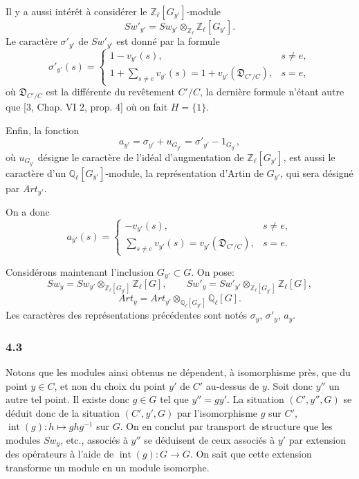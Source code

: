 \documentclass[11pt]{article}
\begin{document}
Il y a aussi intérêt à considérer le $\mathbb Z_\ell[G_{y'}]$-module
\[
Sw'_{y'}=Sw_{y'}\otimes_{\mathbb Z_\ell}\mathbb Z_\ell[G_{y'}].
\tag{4.2.3}
\]
Le caractère $\sigma'_{y'}$ de $Sw'_{y'}$ est donné par la formule
\[
\sigma'_{y'}(s)=
\begin{cases}
1-v_{y'}(s),& s\ne e,\\[0.4em]
\displaystyle 1+\sum_{s\ne e}v_{y'}(s)
=1+v_{y'}(\mathfrak D_{C'/C}),& s=e,
\end{cases}
\tag{4.2.4}
\]
où $\mathfrak D_{C'/C}$ est la différente du revêtement $C'/C$, la dernière formule n'étant autre que [3, Chap. VI 2, prop. 4] où on fait $H=\{1\}$.

Enfin, la fonction
\[
a_{y'}=\sigma_{y'}+u_{G_{y'}}=\sigma'_{y'}-1_{G_{y'}},
\tag{4.2.5}
\]
où $u_{G_{y'}}$ désigne le caractère de l'idéal d'augmentation de $\mathbb Z_\ell[G_{y'}]$, est aussi le caractère d'un $\mathbb Q_\ell[G_{y'}]$-module, la représentation d'Artin de $G_{y'}$, qui sera désigné par $Art_{y'}$.

On a donc
\[
a_{y'}(s)=
\begin{cases}
-v_{y'}(s),& s\ne e,\\[0.4em]
\displaystyle\sum_{s\ne e}v_{y'}(s)=v_{y'}(\mathfrak D_{C'/C}),& s=e.
\end{cases}
\tag{4.2.6}
\]

Considérons maintenant l'inclusion $G_{y'}\subset G$. On pose:
\[
Sw_y=Sw_{y'}\otimes_{\mathbb Z_\ell[G_{y'}]}\mathbb Z_\ell[G],
\qquad
Sw'_y=Sw'_{y'}\otimes_{\mathbb Z_\ell[G_{y'}]}\mathbb Z_\ell[G],
\tag{4.2.7}
\]
\[
Art_y=Art_{y'}\otimes_{\mathbb Q_\ell[G_{y'}]}\mathbb Q_\ell[G].
\tag{4.2.8}
\]
Les caractères des représentations précédentes sont notés $\sigma_y$, $\sigma'_y$, $a_y$.

\subsubsection*{4.3}

Notons que les modules ainsi obtenus ne dépendent, à isomorphisme près, que du point $y\in C$, et non du choix du point $y'$ de $C'$ au-dessus de $y$. Soit donc $y''$ un autre tel point. Il existe donc $g\in G$ tel que $y''=g y'$. La situation $(C',y'',G)$ se déduit donc de la situation $(C',y',G)$ par l'isomorphisme $g$ sur $C'$, $\operatorname{int}(g):h\mapsto ghg^{-1}$ sur $G$. On en conclut par transport de structure que les modules $Sw_y$, etc., associés à $y''$ se déduisent de ceux associés à $y'$ par extension des opérateurs à l'aide de $\operatorname{int}(g):G\to G$. On sait que cette extension transforme un module en un module isomorphe.
\end{document}
